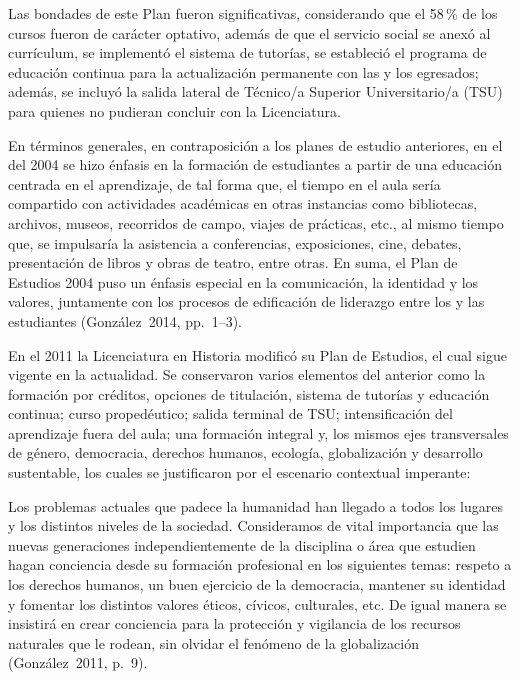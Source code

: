 {Las bondades de este Plan fueron significativas, considerando que el 58\,\% de
los cursos fueron de carácter optativo, además de que el servicio social se
anexó al currículum, se implementó el sistema de tutorías, se estableció el
programa de educación continua para la actualización permanente con las y
los egresados; además, se incluyó la salida lateral de Técnico/a Superior
Universitario/a (TSU) para quienes no pudieran concluir con la
Licenciatura. 


En términos generales, en contraposición a los planes de estudio anteriores,
en el del 2004 se hizo énfasis en la formación de estudiantes  a partir de
una educación centrada en el aprendizaje, de tal forma que, el tiempo
en el aula sería compartido con actividades académicas en otras instancias como
bibliotecas, archivos, museos, recorridos de campo, viajes de prácticas,
etc., al mismo tiempo que, se impulsaría la asistencia a conferencias,
exposiciones, cine, debates, presentación de libros y obras de teatro,
entre otras. En suma, el Plan de Estudios 2004 puso un énfasis especial en
la comunicación, la identidad y los valores,  juntamente con los procesos
de edificación de liderazgo entre los y las estudiantes (González~2014,
pp.~1--3).

 
En el 2011 la Licenciatura en Historia modificó su Plan de Estudios, el cual
sigue vigente en la actualidad. Se conservaron varios elementos del
anterior como la formación por créditos, opciones de titulación, sistema de
tutorías y educación continua; curso propedéutico; salida terminal de TSU;
intensificación del aprendizaje fuera del aula; una formación integral y,
los mismos ejes transversales de género, democracia, derechos humanos,
ecología, globalización y desarrollo sustentable, los cuales se
justificaron por el escenario contextual imperante:


\medskip
Los problemas actuales que padece la humanidad han llegado a todos los
lugares y los distintos niveles de la sociedad.  Consideramos de vital
importancia que las nuevas generaciones independientemente de la disciplina
o área que estudien hagan conciencia desde su formación profesional en los
siguientes temas: respeto a los derechos humanos, un buen ejercicio de la
democracia, mantener su identidad y fomentar los distintos valores éticos,
cívicos,  culturales, etc\@. De igual manera se insistirá en crear conciencia
para la protección y vigilancia de los recursos naturales que le rodean,
sin olvidar el fenómeno de la globalización (González~2011, p.~9).


}
